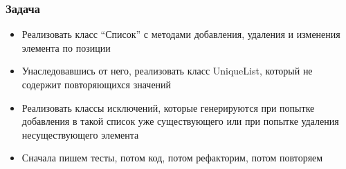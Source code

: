 \documentclass{../../slides-style}
\begin{document}
    \begin{frame}[plain]
        \titlepage
    \end{frame}

    \begin{frame}
        \frametitle{Задача}
        \begin{itemize}
            \item Реализовать класс \enquote{Список} с методами добавления, удаления и изменения элемента по позиции
            \item Унаследовавшись от него, реализовать класс UniqueList, который не содержит повторяющихся значений 
            \item Реализовать классы исключений, которые генерируются при попытке добавления в такой список уже существующего или при попытке удаления несуществующего элемента
            \item Сначала пишем тесты, потом код, потом рефакторим, потом повторяем
        \end{itemize}
    \end{frame}
\end{document}
